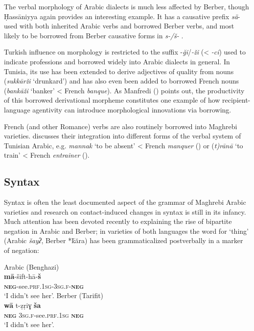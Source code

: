 \documentclass[output=paper]{langsci/langscibook}
\begin{document}
  The verbal morphology of Arabic dialects is much less affected by Berber, though Ḥassāniyya again provides an interesting example. It has a causative prefix \textit{sä}- used with both inherited Arabic verbs and borrowed Berber verbs, and most likely to be borrowed from Berber causative forms in \textit{s-/š-} \citep{Taine-Cheikh2008chapter}. 

  Turkish influence on morphology is restricted to the suffix -\textit{ği}/\textit{{}-ži} (< \textit{{}-ci}) used to indicate professions and borrowed widely into Arabic dialects in general. In Tunisia, its use has been extended to derive adjectives of quality from nouns (\textit{sukkārži} ‘drunkard’) and has also even been added to borrowed French nouns (\textit{bankāži} ‘banker’ < French \textit{banque}). As Manfredi (\citeyear[410]{Manfredi2018}) points out, the productivity of this borrowed derivational morpheme constitutes one example of how recipient-language agentivity can introduce morphological innovations via borrowing.

  French (and other Romance) verbs are also routinely borrowed into Maghrebi varieties. \citet{Talmoudi1986} discusses their integration into different forms of the verbal system of Tunisian Arabic, e.g. \textit{mannak} `to be absent' < French \textit{manquer} (\citeyear[81--82]{Talmoudi1986}) or (\textit{t)rānā} `to train' < French \textit{entrainer} (\citeyear[21--24]{Talmoudi1986}).

\subsection{ Syntax}

Syntax is often the least documented aspect of the grammar of Maghrebi Arabic varieties and research on contact-induced changes in syntax is still in its infancy. Much attention has been devoted recently to explaining the rise of bipartite negation in Arabic and Berber; in varieties of both languages the word for ‘thing’ (Arabic \textit{šayʔ}, Berber *ḱăra) has been grammaticalized postverbally in a marker of negation:


\ea
Arabic (Benghazi)\\
\gll \textbf{mā}-šift-hā-\textbf{š}\\
     \textbf{\textsc{neg}}-see.\textsc{prf}.\textsc{1sg}-\textsc{3sg.f}-\textbf{\textsc{neg}}\\
\glt `I didn’t see her'.
\z
\ea Berber (Tarifit)\\
\gll \textbf{wā}  t-ẓṛiɣ  \textbf{ša}\\
     \textbf{\textsc{neg}}  \textsc{3sg.f}-see.\textsc{prf}.\textsc{1sg}  \textbf{\textsc{neg}}\\
\glt `I didn’t see her'.
\z
\end{document}
